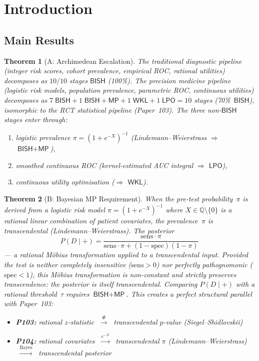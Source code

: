 \documentclass[11pt,a4paper]{article}
\theoremstyle{plain}
\newtheorem{theorem}{Theorem}[section]
\theoremstyle{definition}
\newcommand{\BISH}{\textsf{BISH}}
\newcommand{\WKL}{\textsf{WKL}}
\newcommand{\LPO}{\textsf{LPO}}
\newcommand{\MP}{\textsf{MP}}
\newcommand{\Q}{\mathbb{Q}}
\begin{document}
\section{Introduction}\label{sec:intro}

\subsection{Main Results}

\begin{theorem}[A: Archimedean Escalation]\label{thm:A}
The traditional diagnostic pipeline (integer risk scores, cohort prevalence, empirical ROC, rational utilities) decomposes as $10/10$ stages $\BISH$ (100\%).  The precision medicine pipeline (logistic risk models, population prevalence, parametric ROC, continuous utilities) decomposes as $7\;\BISH + 1\;\BISH{+}\MP + 1\;\WKL + 1\;\LPO = 10$ stages (70\%~$\BISH$), isomorphic to the RCT statistical pipeline (Paper~103).  The three non-$\BISH$ stages enter through:
\begin{enumerate}[nosep]
\item logistic prevalence $\pi = (1+e^{-X})^{-1}$ (Lindemann--Weierstrass $\Rightarrow$ $\BISH + \MP$),
\item smoothed continuous ROC (kernel-estimated AUC integral $\Rightarrow$ $\LPO$),
\item continuous utility optimisation ($\Rightarrow$ $\WKL$).
\end{enumerate}
\end{theorem}

\begin{theorem}[B: Bayesian MP Requirement]\label{thm:B}
When the pre-test probability~$\pi$ is derived from a logistic risk model $\pi = (1 + e^{-X})^{-1}$ where $X \in \Q \setminus \{0\}$ is a rational linear combination of patient covariates, the prevalence~$\pi$ is transcendental (Lindemann--Weierstrass).  The posterior
\[
  P(D \mid +) = \frac{\mathrm{sens} \cdot \pi}{\mathrm{sens} \cdot \pi + (1 - \mathrm{spec})(1 - \pi)}
\]
--- a rational M\"obius transformation applied to a transcendental input.  Provided the test is neither completely insensitive ($\mathrm{sens} > 0$) nor perfectly pathognomonic ($\mathrm{spec} < 1$), this M\"obius transformation is non-constant and strictly preserves transcendence: the posterior is itself transcendental.  Comparing $P(D \mid +)$ with a rational threshold~$\tau$ requires $\BISH + \MP$.  This creates a perfect structural parallel with Paper~103:
\begin{itemize}[nosep]
\item \textbf{P103:} rational $z$-statistic $\;\xrightarrow{\Phi}\;$ transcendental $p$-value (Siegel--Shidlovskii)
\item \textbf{P104:} rational covariates $\;\xrightarrow{e^{-X}}\;$ transcendental $\pi$ (Lindemann--Weierstrass) $\;\xrightarrow{\text{Bayes}}\;$ transcendental posterior
\end{itemize}
\end{theorem}
\end{document}
